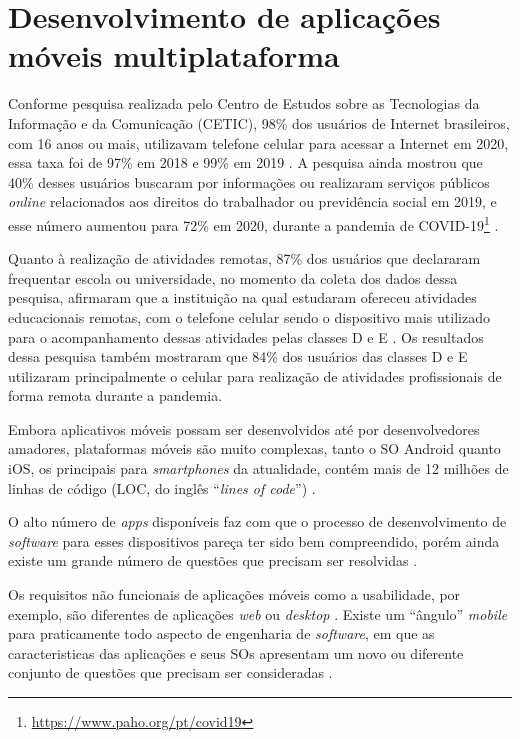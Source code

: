 \section{Desenvolvimento de aplicações móveis multiplataforma}

Conforme pesquisa realizada pelo Centro de Estudos sobre
as Tecnologias da Informação e da Comunicação (CETIC), 98\% dos usuários de Internet brasileiros, com 16 anos ou mais,
utilizavam telefone celular para acessar a Internet em 2020, essa taxa foi de 97\% em 2018 e 99\% em 2019 \cite{CETIC_2021}.
A pesquisa ainda mostrou que 40\% desses usuários buscaram por informações ou realizaram serviços públicos \emph{online} relacionados
aos direitos do trabalhador ou previdência social em 2019, e esse número aumentou para 72\% em
2020, durante a pandemia de COVID-19\footnote{\url{https://www.paho.org/pt/covid19}} \cite{CETIC_2021}.

Quanto à realização de atividades remotas, 87\% dos usuários que declararam frequentar escola ou universidade, no momento da coleta
dos dados dessa pesquisa, afirmaram que a instituição na qual estudaram ofereceu atividades educacionais remotas, com o telefone
celular sendo o dispositivo mais utilizado para o acompanhamento dessas atividades pelas classes D e E \cite{CETIC_2021}. Os resultados
dessa pesquisa também mostraram que 84\% dos usuários das classes D e E utilizaram principalmente o celular para realização de atividades
profissionais de forma remota durante a pandemia.

Embora aplicativos móveis possam ser desenvolvidos até por desenvolvedores amadores, plataformas móveis são muito complexas, tanto o
SO Android quanto iOS, os principais para \emph{smartphones} da atualidade, contém mais de 12 milhões de linhas de código
(LOC, do inglês ``\emph{lines of code}'') \cite{pressman2014software}.

O alto número de \emph{apps} disponíveis faz com que o processo de desenvolvimento de \emph{software} para esses dispositivos pareça
ter sido bem compreendido, porém ainda existe um grande número de questões que precisam ser resolvidas \cite{pressman2014software,Wasserman2010}.

Os requisitos não funcionais de aplicações móveis como a usabilidade, por exemplo, são diferentes de aplicações \emph{web} ou \emph{desktop} \cite{pressman2014software}. 
Existe um ``ângulo'' \emph{mobile} para praticamente todo aspecto de engenharia de \emph{software}, em que as caracteristicas
das aplicações e seus SOs apresentam um novo ou diferente conjunto de questões que precisam ser consideradas \cite{Wasserman2010}.

